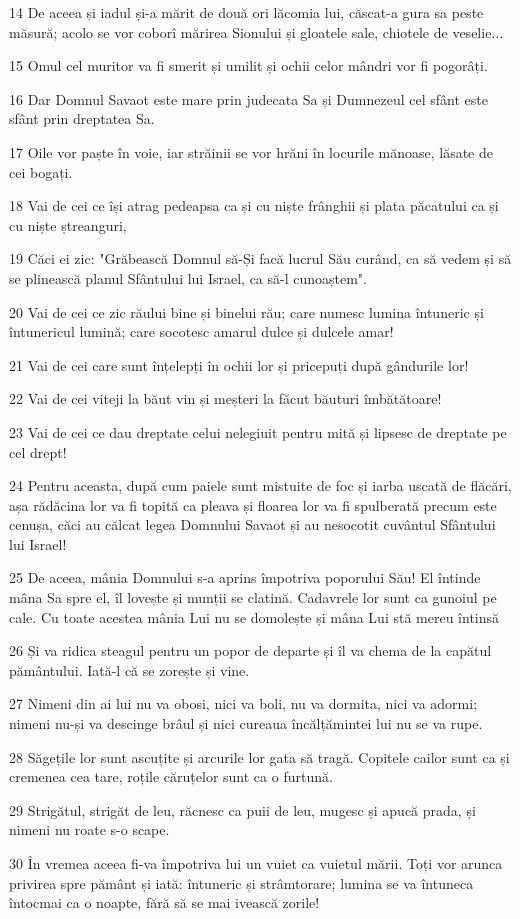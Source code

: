 \par 14 De aceea și iadul și-a mărit de două ori lăcomia lui, căscat-a gura sa peste măsură; acolo se vor coborî mărirea Sionului și gloatele sale, chiotele de veselie...
\par 15 Omul cel muritor va fi smerit și umilit și ochii celor mândri vor fi pogorâți.
\par 16 Dar Domnul Savaot este mare prin judecata Sa și Dumnezeul cel sfânt este sfânt prin dreptatea Sa.
\par 17 Oile vor paște în voie, iar străinii se vor hrăni în locurile mănoase, lăsate de cei bogați.
\par 18 Vai de cei ce își atrag pedeapsa ca și cu niște frânghii și plata păcatului ca și cu niște ștreanguri,
\par 19 Căci ei zic: "Grăbească Domnul să-Și facă lucrul Său curând, ca să vedem și să se plinească planul Sfântului lui Israel, ca să-l cunoaștem".
\par 20 Vai de cei ce zic răului bine și binelui rău; care numesc lumina întuneric și întunericul lumină; care socotesc amarul dulce și dulcele amar!
\par 21 Vai de cei care sunt înțelepți în ochii lor și pricepuți după gândurile lor!
\par 22 Vai de cei viteji la băut vin și meșteri la făcut băuturi îmbătătoare!
\par 23 Vai de cei ce dau dreptate celui nelegiuit pentru mită și lipsesc de dreptate pe cel drept!
\par 24 Pentru aceasta, după cum paiele sunt mistuite de foc și iarba uscată de flăcări, așa rădăcina lor va fi topită ca pleava și floarea lor va fi spulberată precum este cenușa, căci au călcat legea Domnului Savaot și au nesocotit cuvântul Sfântului lui Israel!
\par 25 De aceea, mânia Domnului s-a aprins împotriva poporului Său! El întinde mâna Sa spre el, îl lovește și munții se clatină. Cadavrele lor sunt ca gunoiul pe cale. Cu toate acestea mânia Lui nu se domolește și mâna Lui stă mereu întinsă
\par 26 Și va ridica steagul pentru un popor de departe și îl va chema de la capătul pământului. Iată-l că se zorește și vine.
\par 27 Nimeni din ai lui nu va obosi, nici va boli, nu va dormita, nici va adormi; nimeni nu-și va descinge brâul și nici cureaua încălțămintei lui nu se va rupe.
\par 28 Săgețile lor sunt ascuțite și arcurile lor gata să tragă. Copitele cailor sunt ca și cremenea cea tare, roțile căruțelor sunt ca o furtună.
\par 29 Strigătul, strigăt de leu, răcnesc ca puii de leu, mugesc și apucă prada, și nimeni nu roate s-o scape.
\par 30 În vremea aceea fi-va împotriva lui un vuiet ca vuietul mării. Toți vor arunca privirea spre pământ și iată: întuneric și strâmtorare; lumina se va întuneca întocmai ca o noapte, fără să se mai ivească zorile!

